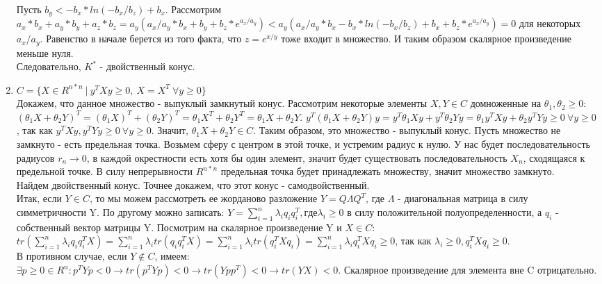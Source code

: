 \documentclass[12pt]{extreport}
\theoremstyle{definiton}
\theoremstyle{definition}
\theoremstyle{definition}
\let\geq\geqslant
\begin{document}
\begin{enumerate}
	        \\Пусть $b_y < -b_x*ln(-b_x/b_z)+b_x$. Рассмотрим $a_x*b_x+a_y*b_y+a_z*b_z = a_y(a_x/a_y * b_x + b_y + b_z*e^{a_x/a_y}) < a_y(a_x/a_y * b_x -b_x*ln(-b_x/b_z)+b_x + b_z*e^{a_x/a_y}) = 0$ для некоторых $a_x/a_y$. Равенство в начале берется из того факта, что $z=e^{x/y}$ тоже входит в множество. И таким образом скалярное произведение меньше нуля.
	        \\ Следовательно, $K^*$ - двойственный конус.
	        \item $C = \{X\in R^{n*n}\ |\ y^TXy \geq 0,\ X=X^T\ \forall y \geq 0\}$
	        \\ Докажем, что данное множество - выпуклый замкнутый конус. Рассмотрим некоторые элементы $X, Y \in C$ домноженные на $\theta_1, \theta_2 \geq 0$: $(\theta_1 X+\theta_2 Y)^T = (\theta_1 X)^T + (\theta_2 Y)^T= \theta_1 X^T + \theta_2 Y^T = \theta_1 X + \theta_2 Y.$ $y^T(\theta_1 X + \theta_2 Y)y = y^T\theta_1Xy + y^T\theta_2Yy = \theta_1 y^TXy + \theta_2y^TYy \geq 0\ \forall y \geq 0$, так как $y^TXy, y^TYy \geq 0\ \forall y \geq 0$. Значит, $\theta_1 X + \theta_2 Y\in C$. Таким образом, это множество - выпуклый конус. Пусть множество не замкнуто - есть предельная точка. Возьмем сферу с центром в этой точке, и устремим радиус к нулю. У нас будет последовательность радиусов $r_n \to 0$, в каждой окрестности есть хотя бы один элемент, значит будет существовать последовательность $X_n$, сходящаяся к предельной точке. В силу непрерывности $R^{n*n}$ предельная точка будет принадлежать множеству, значит множество замкнуто.
	        \\Найдем двойственный конус. Точнее докажем, что этот конус - самодвойственный. 
	        \\Итак, если $Y \in C$, то мы можем рассмотреть ее жорданово разложение $Y = Q\Lambda Q^T$, где $\Lambda$ - диагональная матрица в силу симметричности Y. По другому можно записать: $Y = \sum_{i=1}^{n}\lambda_iq_iq_i^T, где \lambda_i \geq 0$ в силу положительной полуопределенности, а $q_i$ - собственный вектор матрицы Y. Посмотрим на скалярное произведение Y и $X \in C$: $tr(\sum_{i=1}^{n}\lambda_i q_iq_i^T X) = \sum_{i=1}^{n}\lambda_i tr(q_iq_i^TX) = \sum_{i=1}^{n}\lambda_i tr(q_i^TXq_i)=\sum_{i=1}^{n}\lambda_i q_i^TXq_i  \geq 0$, так как $ \lambda_i \geq 0, q_i^TXq_i \geq 0$.
	        \\В противном случае, если $Y \notin C$, имеем:
	        \\ $\exists p \geq 0 \in R^n: p^TYp < 0 \to tr(p^TYp) < 0 \to tr(Ypp^T) < 0 \to tr(YX) < 0.$ Скалярное произведение для элемента вне C отрицательно.

\end{enumerate}
\end{document}
